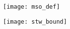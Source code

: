 \begin{figure}[h]
	\begin{center}
	\texttt{[image: mso\_def]}
	\end{center}
\end{figure}

\begin{figure}[h]
	\begin{center}
	\texttt{[image: stw\_bound]}
	\end{center}
\end{figure}